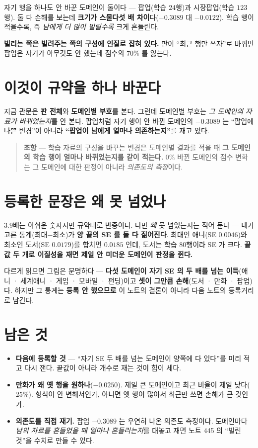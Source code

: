 \documentclass[11pt]{article}
\begin{document}
자기 행을 하나도 안 바꾼 도메인이 둘이다 --- 팝업(학습 $24$행)과
시장팝업(학습 $123$행). 둘 다 손해를 보는데 \textbf{크기가 스물다섯 배
차이}다($-0.3089$ 대 $-0.0122$). 학습 행이 적을수록, 즉 \emph{남에게
더 많이 빌릴수록} 크게 흔들린다.

\textbf{빌리는 쪽은 빌려주는 쪽의 구성에 인질로 잡혀 있다.} 판이
``최근 행만 쓰자''로 바뀌면 팝업은 자기가 아무것도 안 했는데 점수의
$70\%$ 를 잃는다.

\section{이것이 규약을 하나 바꾼다}

지금 관문은 \textbf{판 전체}와 \textbf{도메인별 부호}를 본다. 그런데
도메인별 부호는 \emph{그 도메인의 자료가 바뀌었는지}를 안 본다. 팝업처럼
자기 행이 안 바뀐 도메인의 $-0.3089$ 는 ``팝업에 나쁜 변경''이 아니라
\textbf{``팝업이 남에게 얼마나 의존하는지''}를 재고 있다.

\begin{quote}
\textbf{조항} --- 학습 자료의 구성을 바꾸는 변경은 도메인별 결과를 적을
때 \textbf{그 도메인의 학습 행이 얼마나 바뀌었는지를 같이 적는다.}
$0\%$ 바뀐 도메인의 점수 변화는 그 도메인에 대한 판정이 아니라
\emph{의존도의 측정}이다.
\end{quote}

\section{등록한 문장은 왜 못 넘었나}

$3.9$배는 아쉬운 숫자지만 규약대로 반증이다. 다만 \emph{왜} 못 넘었는지는
적어 둔다 --- 내가 고른 통계(최대$-$최소)가 \textbf{양 끝의 SE 를 둘 다
짊어진다}. 최대인 애니(SE $0.0046$)와 최소인 도서(SE $0.0179$)를 합치면
$0.0185$ 인데, 도서는 학습 $80$행이라 SE 가 크다. \textbf{끝값 두 개로
이질성을 재면 제일 안 미더운 도메인이 판정을 쥔다.}

다르게 읽으면 그림은 분명하다 --- \textbf{다섯 도메인이 자기 SE 의 두 배를
넘는 이득}(애니 · 세계애니 · 게임 · 모바일 · 펀딩)이고 \textbf{셋이 그만큼
손해}(도서 · 만화 · 팝업)다. 하지만 그 통계는 \textbf{등록 안 했으므로}
이 노트의 결론이 아니라 다음 노트의 등록거리로 남긴다.

\section*{남은 것}

\begin{itemize}
\item \textbf{다음에 등록할 것} --- ``자기 SE 두 배를 넘는 도메인이
양쪽에 다 있다''를 미리 적고 다시 잰다. 끝값이 아니라 개수로 재는 것이
힘이 세다.
\item \textbf{만화가 왜 옛 행을 원하나}($-0.0250$). 제일 큰 도메인이고
최근 비율이 제일 낮다($25\%$). 형식이 안 변해서인가, 아니면 옛 행이
많아서 최근만 쓰면 손해가 큰 것인가.
\item \textbf{의존도를 직접 재기.} 팝업 $-0.3089$ 는 우연히 나온
의존도 측정이다. 도메인마다 \emph{남의 자료를 흔들었을 때 얼마나
흔들리는지}를 대놓고 재면 노트 445 의 ``빌린 것''을 수치로 만들 수 있다.
\end{itemize}
\end{document}
